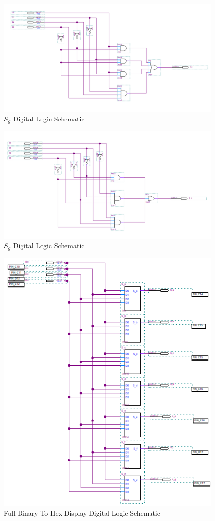 \documentclass{article}
\begin{document}
\begin{figure}[H]
  \centering
  \includegraphics[width=1\textwidth]{S_f_schem.png}
  \caption{$S_g$ Digital Logic Schematic}
\end{figure}

\begin{figure}[H]
  \centering
  \includegraphics[width=1\textwidth]{S_g_schem.png}
  \caption{$S_g$ Digital Logic Schematic}
\end{figure}

\begin{figure}[H]
  \centering
  \includegraphics[width=.8\textwidth]{full_schem.png}
  \caption{Full Binary To Hex Display Digital Logic Schematic}
\end{figure}
\end{document}
